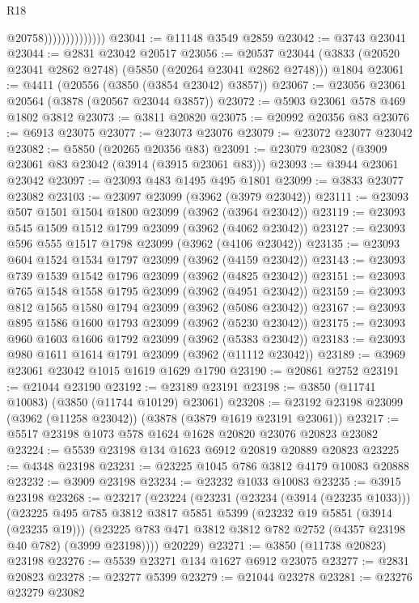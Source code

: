 \begin{lexlean}{R18}
\begin{coremodule}
                                @20758))))))))))))))
@23041 := @11148 @3549 @2859
@23042 := @3743 @23041
@23044 := @2831 @23042 @20517
@23056 := @20537
    @23044
    (@3833 (@20520 @23041 @2862 @2748) (@5850 (@20264 @23041 @2862 @2748)))
    @1804
@23061 := @4411 (@20556 (@3850 (@3854 @23042) @3857))
@23067 := @23056 @23061 @20564 (@3878 (@20567 @23044 @3857))
@23072 := @5903 @23061 @578 @469 @1802 @3812
@23073 := @3811 @20820
@23075 := @20992 @20356 @83
@23076 := @6913 @23075
@23077 := @23073 @23076
@23079 := @23072 @23077 @23042
@23082 := @5850 (@20265 @20356 @83)
@23091 := @23079 @23082 (@3909 @23061 @83 @23042 (@3914 (@3915 @23061 @83)))
@23093 := @3944 @23061 @23042
@23097 := @23093 @483 @1495 @495 @1801
@23099 := @3833 @23077 @23082
@23103 := @23097 @23099 (@3962 (@3979 @23042))
@23111 := @23093 @507 @1501 @1504 @1800 @23099 (@3962 (@3964 @23042))
@23119 := @23093 @545 @1509 @1512 @1799 @23099 (@3962 (@4062 @23042))
@23127 := @23093 @596 @555 @1517 @1798 @23099 (@3962 (@4106 @23042))
@23135 := @23093 @604 @1524 @1534 @1797 @23099 (@3962 (@4159 @23042))
@23143 := @23093 @739 @1539 @1542 @1796 @23099 (@3962 (@4825 @23042))
@23151 := @23093 @765 @1548 @1558 @1795 @23099 (@3962 (@4951 @23042))
@23159 := @23093 @812 @1565 @1580 @1794 @23099 (@3962 (@5086 @23042))
@23167 := @23093 @895 @1586 @1600 @1793 @23099 (@3962 (@5230 @23042))
@23175 := @23093 @960 @1603 @1606 @1792 @23099 (@3962 (@5383 @23042))
@23183 := @23093 @980 @1611 @1614 @1791 @23099 (@3962 (@11112 @23042))
@23189 := @3969 @23061 @23042 @1015 @1619 @1629 @1790
@23190 := @20861 @2752
@23191 := @21044 @23190
@23192 := @23189 @23191
@23198 := @3850 (@11741 @10083) (@3850 (@11744 @10129) @23061)
@23208 := @23192 @23198 @23099 (@3962 (@11258 @23042)) (@3878 (@3879 @1619 @23191 @23061))
@23217 := @5517 @23198 @1073 @578 @1624 @1628 @20820 @23076 @20823 @23082
@23224 := @5539 @23198 @134 @1623 @6912 @20819 @20889 @20823
@23225 := @4348 @23198
@23231 := @23225 @1045 @786 @3812 @4179 @10083 @20888
@23232 := @3909 @23198
@23234 := @23232 @1033 @10083
@23235 := @3915 @23198
@23268 := @23217
    (@23224
      (@23231
        (@23234 (@3914 (@23235 @1033)))
        (@23225
          @495
          @785
          @3812
          @3817
          @5851
          @5399
          (@23232 @19 @5851 (@3914 (@23235 @19)))
          (@23225 @783 @471 @3812 @3812 @782 @2752 (@4357 @23198 @40 @782) (@3999 @23198))))
      @20229)
@23271 := @3850 (@11738 @20823) @23198
@23276 := @5539 @23271 @134 @1627 @6912 @23075
@23277 := @2831 @20823
@23278 := @23277 @5399
@23279 := @21044 @23278
@23281 := @23276 @23279 @23082

\end{coremodule}
\end{lexlean}

